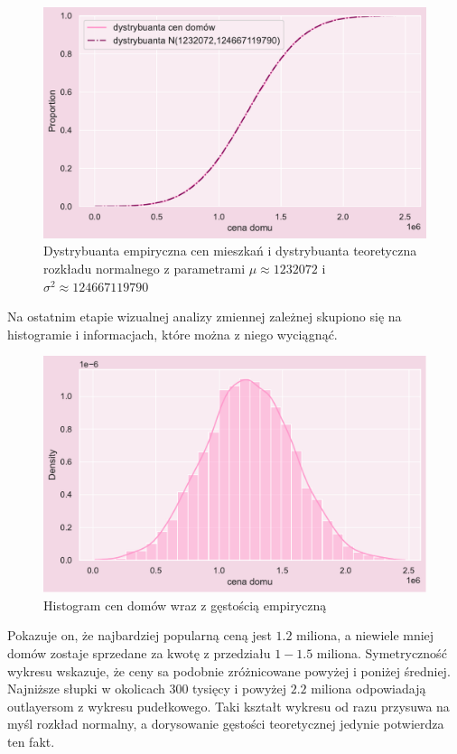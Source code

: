 \documentclass{article}
\begin{document}
    \begin{figure}[H]
	\begin{center}
		\includegraphics[scale=0.68]{images/price_dystr.pdf}
		\caption{Dystrybuanta empiryczna cen mieszkań i dystrybuanta teoretyczna rozkładu normalnego z parametrami $\mu \approx 1232072 $ i $\sigma^2 \approx 124667119790 $}
		\label{denistyx}
	\end{center}
	\end{figure}
\noindent Na ostatnim etapie wizualnej analizy zmiennej zależnej skupiono się na histogramie i informacjach, które można z niego wyciągnąć.
\begin{figure}[H]
	\begin{center}
		\includegraphics[scale=0.68]{images/price_hist.pdf}
		\caption{Histogram cen domów wraz z gęstością empiryczną}
		\label{denistyx}
	\end{center}
	\end{figure}
 \noindent Pokazuje on, że najbardziej popularną ceną jest $1.2$ miliona, a niewiele mniej domów zostaje sprzedane za kwotę z przedziału $1 - 1.5$ miliona. Symetryczność wykresu wskazuje, że ceny sa podobnie zróżnicowane powyżej i poniżej średniej. Najniższe słupki w okolicach $300$ tysięcy i powyżej $2.2$ miliona odpowiadają outlayersom z wykresu pudełkowego. Taki kształt wykresu od razu przysuwa na myśl rozkład normalny, a dorysowanie gęstości teoretycznej jedynie potwierdza ten fakt.
\end{document}
